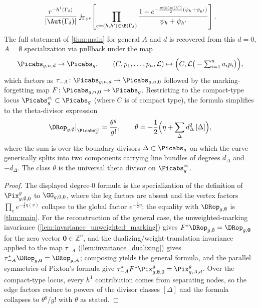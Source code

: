 \begin{theorem}
\[    \frac{r^{-h^1(\Gamma_\delta)}}{|\Aut(\Gamma_\delta)|}
    \; j_{\Gamma_\delta*}\!\left[
      \prod_{e=(h,h') \in \E(\Gamma_\delta)}
        \frac{1 - e^{-\frac{w(h)w(h')}{2}(\psi_h + \psi_{h'})}}{\psi_h + \psi_{h'}}
    \right].
  \]
  The full statement of \cref{thm:main} for general $A$ and $d$ is recovered from this
  $d = 0$, $A = \emptyset$ specialization via pullback under the map
  \[
    \Picabs_{g,n,d} \to \Picabs_g, \qquad
    (C, p_1,\ldots,p_n, \mathcal{L}) \mapsto \Big(C, \mathcal{L}\big(-\textstyle\sum_{i=1}^n a_i p_i\big)\Big),
  \]
  which factors as $\tau_{-A}\colon \Picabs_{g,n,d} \to \Picabs_{g,n,0}$ followed by the
  marking-forgetting map $F\colon \Picabs_{g,n,0} \to \Picabs_g$.
  Restricting to the compact-type locus
  $\Picabs_g^{\mathrm{ct}} \subset \Picabs_g$ (where $C$ is of compact type), the formula
  simplifies to the theta-divisor expression
  \[
    \DRop_{g,\emptyset}\big|_{\Picabs_g^{\mathrm{ct}}} = \frac{\theta^g}{g!},
    \qquad
    \theta = -\frac{1}{2}\Big(\eta + \sum_{\Delta} d_\Delta^2\, [\Delta]\Big),
  \]
  where the sum is over the boundary divisors $\Delta \subset \Picabs_g$ on which the curve
  generically splits into two components carrying line bundles of degrees $d_\Delta$ and
  $-d_\Delta$.  The class $\theta$ is the universal theta divisor on
  $\Picabs_g^{\mathrm{ct}}$.
\end{theorem}

\begin{proof}
  The displayed degree-$0$ formula is the specialization of the definition of
  $\Pix^g_{g,\emptyset,0}$ to $\GG_{g,0,0}$, where the leg factors are absent and the vertex
  factors $\prod_v e^{-\frac{1}{2}\eta(v)}$ collapse to the global factor $e^{-\frac{1}{2}\eta}$;
  the equality with $\DRop_{g,\emptyset}$ is \cref{thm:main}.  For the reconstruction of the
  general case, the unweighted-marking invariance (\cref{lem:invariance_unweighted_marking})
  gives $F^*\DRop_{g,\emptyset} = \DRop_{g,\mathbf{0}}$ for the zero vector
  $\mathbf{0} \in \mathbb{Z}^n$, and the dualizing/weight-translation invariance applied to the
  map $\tau_{-A}$ (\cref{lem:invariance_dualizing}) gives
  $\tau_{-A}^*\DRop_{g,\mathbf{0}} = \DRop_{g,A}$; composing yields the general formula, and
  the parallel symmetries of Pixton's formula give $\tau_{-A}^*F^*\Pix^g_{g,\emptyset,0} =
  \Pix^g_{g,A,d}$.  Over the compact-type locus, every $h^1$ contribution comes from
  separating nodes, so the edge factors reduce to powers of the divisor classes $[\Delta]$
  and the formula collapses to $\theta^g/g!$ with $\theta$ as stated.
\end{proof}
